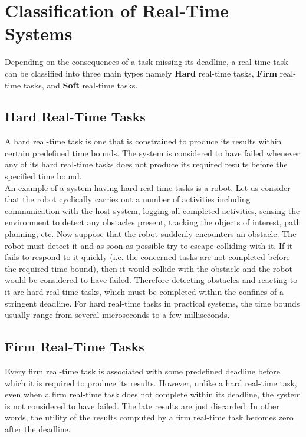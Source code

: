 \documentclass[12pt]{report}
\begin{document}
\section{Classification of Real-Time Systems}
Depending on the consequences of a task missing its deadline, a real-time task can be classified into three main types namely \textbf{Hard} real-time tasks, \textbf{Firm} real-time tasks, and \textbf{Soft} real-time tasks. 

\subsection{Hard Real-Time Tasks}
A hard real-time task is one that is constrained to produce its results within certain predefined time bounds. The system is considered to have failed whenever any of its hard real-time tasks does not produce its required results before the specified time bound. \\

An example of a system having hard real-time tasks is a robot. Let us consider that the robot cyclically carries out a number of activities including communication with the host system, logging all completed activities, sensing the environment to detect any obstacles present, tracking the objects of interest, path planning, etc. Now suppose that the robot suddenly encounters an obstacle. The robot must detect it and as soon as possible try to escape colliding with it. If it fails to respond to it quickly (i.e. the concerned tasks are not completed before the required time bound), then it would collide with the obstacle and the robot would be considered to have failed. Therefore detecting obstacles and reacting to it are hard real-time tasks, which must be completed within the confines of a stringent deadline. For hard real-time tasks in practical systems, the time bounds usually range from several microseconds to a few milliseconds. 

\subsection{Firm Real-Time Tasks}
Every firm real-time task is associated with some predefined deadline before which it is required to produce its results. However, unlike a hard real-time task, even when a firm real-time task does not complete within its deadline, the system is not considered to have failed. The late results are just discarded. In other words, the utility of the results computed by a firm real-time task becomes zero after the deadline. 
\end{document}
